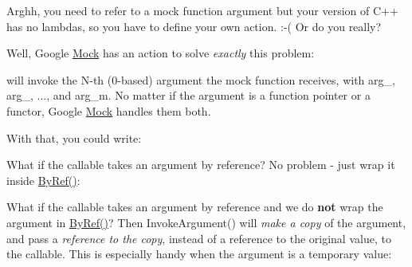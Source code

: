 Arghh, you need to refer to a mock function argument but your version of C++ has no lambdas, so you have to define your own action. \+:-\/( Or do you really?

Well, Google \mbox{\hyperlink{classMock}{Mock}} has an action to solve {\itshape exactly} this problem\+:


\begin{DoxyCode}{0}
\end{DoxyCode}


will invoke the {\ttfamily N}-\/th (0-\/based) argument the mock function receives, with {\ttfamily arg\+\_}, {\ttfamily arg\+\_}, ..., and {\ttfamily arg\+\_\+m}. No matter if the argument is a function pointer or a functor, Google \mbox{\hyperlink{classMock}{Mock}} handles them both.

With that, you could write\+:


\begin{DoxyCode}{0}
\end{DoxyCode}


What if the callable takes an argument by reference? No problem -\/ just wrap it inside {\ttfamily \mbox{\hyperlink{namespacetesting_aaee6d42dcd69de6e7a1459c5c71222c3}{By\+Ref()}}}\+:


\begin{DoxyCode}{0}
\DoxyCodeLine{}
\end{DoxyCode}


What if the callable takes an argument by reference and we do {\bfseries{not}} wrap the argument in {\ttfamily \mbox{\hyperlink{namespacetesting_aaee6d42dcd69de6e7a1459c5c71222c3}{By\+Ref()}}}? Then {\ttfamily Invoke\+Argument()} will {\itshape make a copy} of the argument, and pass a {\itshape reference to the copy}, instead of a reference to the original value, to the callable. This is especially handy when the argument is a temporary value\+:


